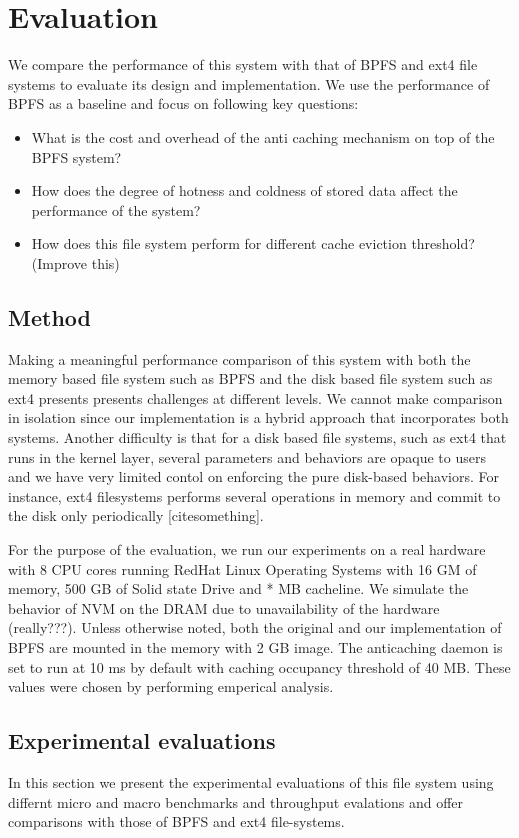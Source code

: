 \section{Evaluation}
We compare the performance of this system with that of BPFS and ext4 file systems to evaluate its design and implementation. We use the performance of BPFS as a baseline and focus on following key questions:
\begin{itemize}
\item What is the cost and overhead of the anti caching mechanism on top of the BPFS system?
\item How does the degree of hotness and coldness of stored data affect the performance of the system?
\item How does this file system perform for different cache eviction threshold? (Improve this)
\end{itemize}

\subsection{Method}
Making a meaningful performance comparison of this system with both the memory based file system such as BPFS and the disk based file system such as ext4 presents presents challenges at different levels. We cannot make comparison in isolation since our implementation is a hybrid approach that incorporates both systems. Another difficulty is that for a disk based file systems, such as ext4 that runs in the kernel layer, several parameters and behaviors are opaque to users and we have very limited contol on enforcing the pure disk-based behaviors. For instance, ext4 filesystems performs several operations in memory and commit to the disk only periodically [cite{something}]. 

For the purpose of the evaluation, we run our experiments on a real hardware with 8 CPU cores running RedHat Linux Operating Systems with 16 GM of memory, 500 GB of Solid state Drive and * MB cacheline. We simulate the behavior of NVM on the DRAM due to unavailability of the hardware (really???). Unless otherwise noted, both the original and our implementation of BPFS are mounted in the memory with 2 GB image. The anticaching daemon is set to run at 10 ms by default with caching occupancy threshold of 40 MB. These values were chosen by performing emperical analysis.    

\subsection{Experimental evaluations}
In this section we present the experimental evaluations of this file system using differnt micro and macro benchmarks and throughput evalations and offer comparisons with those of BPFS and ext4 file-systems. 

